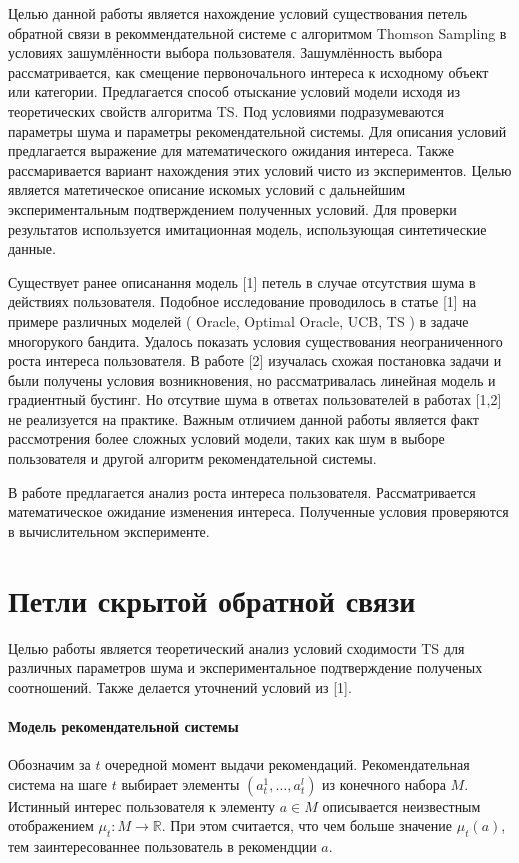\documentclass[12pt, twoside]{article}
\begin{document}
Целью данной работы является нахождение условий существования петель обратной связи в рекоммендательной системе с алгоритмом Thomson Sampling в условиях зашумлённости выбора пользователя.
Зашумлённость выбора рассматривается, как смещение первоночального интереса к исходному объект или категории.
Предлагается способ отыскание условий модели исходя из теоретических свойств алгоритма TS. 
Под условиями подразумеваются параметры шума и параметры рекомендательной системы. 
Для описания условий предлагается выражение для математического ожидания интереса.  
Также рассмаривается вариант нахождения этих условий чисто из экспериментов. 
Целью является матетическое описание искомых условий с дальнейшим экспериментальным подтверждением полученных условий.
Для проверки результатов используется имитационная модель, использующая синтетические данные.  

Существует ранее описанання модель [1] петель  в случае отсутствия шума в действиях пользователя.
Подобное исследование проводилось в статье [1] на примере различных моделей ( Oracle, Optimal Oracle, UCB,  TS ) в задаче многорукого бандита. 
Удалось показать условия существования неограниченного роста интереса пользователя. 
В работе [2] изучалась схожая постановка задачи и были получены условия возникновения, но рассматривалась линейная модель и градиентный бустинг. 
Но отсутвие шума в ответах пользователей в работах [1,2] не реализуется на практике. 
Важным отличием данной работы является факт рассмотрения более сложных условий модели, таких как шум в выборе пользователя и другой алгоритм рекомендательной системы.  

В работе предлагается анализ роста интереса пользователя.
Рассматривается математическое ожидание изменения интереса. 
Полученные условия проверяются в вычислительном эксперименте. 

\section{Петли скрытой обратной связи}
Целью работы является теоретический анализ условий сходимости TS для различных параметров шума и экспериментальное подтверждение полученых соотношений. 
Также делается уточнений условий из [1]. 
\paragraph{Модель рекомендательной системы}
Обозначим за $t$ очередной момент выдачи рекомендаций.
Рекомендательная система на шаге $t$ выбирает элементы $(a^1_t, \dots, a^l_t)$ из конечного набора $M$. 
Истинный $\textit{интерес}$ пользователя к элементу $a \in M$ описывается неизвестным отображением $\mu_t : M \to \mathbb{R}$. 
При этом считается, что чем больше значение $\mu_t (a)$, тем заинтересованнее пользователь в рекомендции $a$.
\end{document}
